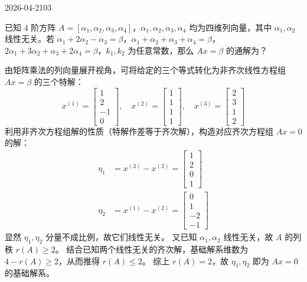 \begin{mistake}{2026-04-21}{03}

\begin{problemcontent}
已知 4 阶方阵 \(A = [\alpha_1, \alpha_2, \alpha_3, \alpha_4]\)，\(\alpha_1, \alpha_2, \alpha_3, \alpha_4\) 均为四维列向量，其中 \(\alpha_1, \alpha_2\) 线性无关。若 \(\alpha_1 + 2\alpha_2 - \alpha_3 = \beta\)，\(\alpha_1 + \alpha_2 + \alpha_3 + \alpha_4 = \beta\)，\(2\alpha_1 + 3\alpha_2 + \alpha_3 + 2\alpha_4 = \beta\)，\(k_1, k_2\) 为任意常数，那么 \(Ax = \beta\) 的通解为？
\end{problemcontent}

\begin{solutioncontent}
由矩阵乘法的列向量展开视角，可将给定的三个等式转化为非齐次线性方程组 \(Ax = \beta\) 的三个特解：
\[
x^{(1)} = \begin{bmatrix} 1 \\ 2 \\ -1 \\ 0 \end{bmatrix},\quad
x^{(2)} = \begin{bmatrix} 1 \\ 1 \\ 1 \\ 1 \end{bmatrix},\quad
x^{(3)} = \begin{bmatrix} 2 \\ 3 \\ 1 \\ 2 \end{bmatrix}
\]
利用非齐次方程组解的性质（特解作差等于齐次解），构造对应齐次方程组 \(Ax = 0\) 的解：
\[
\begin{aligned}
\eta_1 &= x^{(3)} - x^{(2)} = \begin{bmatrix} 1 \\ 2 \\ 0 \\ 1 \end{bmatrix} \\
\eta_2 &= x^{(1)} - x^{(2)} = \begin{bmatrix} 0 \\ 1 \\ -2 \\ -1 \end{bmatrix}
\end{aligned}
\]
显然 \(\eta_1, \eta_2\) 分量不成比例，故它们线性无关。
又已知 \(\alpha_1, \alpha_2\) 线性无关，故 \(A\) 的列秩 \(r(A) \ge 2\)。
结合已知两个线性无关的齐次解，基础解系维数为 \(4 - r(A) \ge 2\)，从而推得 \(r(A) \le 2\)。
综上 \(r(A) = 2\)，故 \(\eta_1, \eta_2\) 即为 \(Ax=0\) 的基础解系。


\end{solutioncontent}
\end{mistake}
